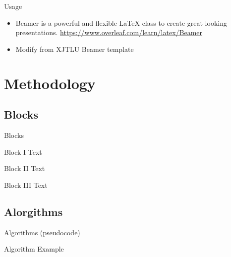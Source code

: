 \documentclass{libs/JITRI_format}
\begin{document}
\begin{frame}{Usage}
    \begin{itemize}
        \item Beamer is a powerful and flexible \LaTeX{} class to create great looking presentations.   \url{https://www.overleaf.com/learn/latex/Beamer}
        \item Modify from XJTLU Beamer template \cite{origin}
    \end{itemize}
\end{frame}

\section{Methodology}

\subsection{Blocks}
\begin{frame}{Blocks}
    \begin{block}{Block I}
        Text
    \end{block}

    \begin{alertblock}{Block II}
        Text
    \end{alertblock}

    \begin{exampleblock}{Block III}
        Text
    \end{exampleblock}  
    
 
\end{frame}


\subsection{Alorgithms}
\begin{frame}{Algorithms (pseudocode)}
    \begin{algorithm}[H]
        \SetAlgoLined
        \LinesNumbered
         \caption{Algorithm Example}
    \end{algorithm}
\end{frame}
\end{document}
